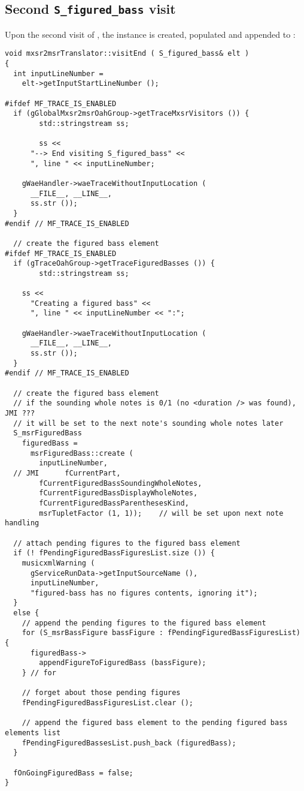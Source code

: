\subsection{Second {\tt S_figured_bass} visit}

Upon the second visit of , the  instance is created, populated and appended to :
\begin{lstlisting}[language=CPlusPlus]
void mxsr2msrTranslator::visitEnd ( S_figured_bass& elt )
{
  int inputLineNumber =
    elt->getInputStartLineNumber ();

#ifdef MF_TRACE_IS_ENABLED
  if (gGlobalMxsr2msrOahGroup->getTraceMxsrVisitors ()) {
		std::stringstream ss;

		ss <<
      "--> End visiting S_figured_bass" <<
      ", line " << inputLineNumber;

    gWaeHandler->waeTraceWithoutInputLocation (
      __FILE__, __LINE__,
      ss.str ());
  }
#endif // MF_TRACE_IS_ENABLED

  // create the figured bass element
#ifdef MF_TRACE_IS_ENABLED
  if (gTraceOahGroup->getTraceFiguredBasses ()) {
		std::stringstream ss;

    ss <<
      "Creating a figured bass" <<
      ", line " << inputLineNumber << ":";

    gWaeHandler->waeTraceWithoutInputLocation (
      __FILE__, __LINE__,
      ss.str ());
  }
#endif // MF_TRACE_IS_ENABLED

  // create the figured bass element
  // if the sounding whole notes is 0/1 (no <duration /> was found), JMI ???
  // it will be set to the next note's sounding whole notes later
  S_msrFiguredBass
    figuredBass =
      msrFiguredBass::create (
        inputLineNumber,
  // JMI      fCurrentPart,
        fCurrentFiguredBassSoundingWholeNotes,
        fCurrentFiguredBassDisplayWholeNotes,
        fCurrentFiguredBassParenthesesKind,
        msrTupletFactor (1, 1));    // will be set upon next note handling

  // attach pending figures to the figured bass element
  if (! fPendingFiguredBassFiguresList.size ()) {
    musicxmlWarning (
      gServiceRunData->getInputSourceName (),
      inputLineNumber,
      "figured-bass has no figures contents, ignoring it");
  }
  else {
    // append the pending figures to the figured bass element
    for (S_msrBassFigure bassFigure : fPendingFiguredBassFiguresList) {
      figuredBass->
        appendFigureToFiguredBass (bassFigure);
    } // for

    // forget about those pending figures
    fPendingFiguredBassFiguresList.clear ();

    // append the figured bass element to the pending figured bass elements list
    fPendingFiguredBassesList.push_back (figuredBass);
  }

  fOnGoingFiguredBass = false;
}
\end{lstlisting}



